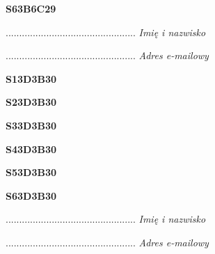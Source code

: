 \begin{turn}{90}\huge \textbf{S63B6C29}\end{turn}

\begin{turn}{90}\begin{minipage}{\linewidth} \vspace{20mm} ................................................  \textit{Imię i nazwisko}\end{minipage}\end{turn}

\begin{turn}{90}\begin{minipage}{\linewidth} \vspace{20mm} ................................................  \textit{Adres e-mailowy}\end{minipage}\end{turn}

\begin{turn}{90}\huge \textbf{S13D3B30}\end{turn}

\begin{turn}{90}\huge \textbf{S23D3B30}\end{turn}

\begin{turn}{90}\huge \textbf{S33D3B30}\end{turn}

\begin{turn}{90}\huge \textbf{S43D3B30}\end{turn}

\begin{turn}{90}\huge \textbf{S53D3B30}\end{turn}

\begin{turn}{90}\huge \textbf{S63D3B30}\end{turn}

\begin{turn}{90}\begin{minipage}{\linewidth} \vspace{20mm} ................................................  \textit{Imię i nazwisko}\end{minipage}\end{turn}

\begin{turn}{90}\begin{minipage}{\linewidth} \vspace{20mm} ................................................  \textit{Adres e-mailowy}\end{minipage}\end{turn}

